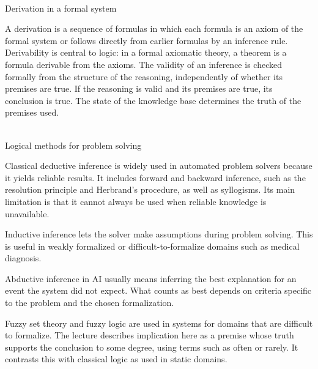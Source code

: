 \begin{frame}{\\Derivation in a formal system}
\topline
\justifying
\vspace{10mm}


        A derivation is a sequence of formulas in which each formula is an axiom of the formal system or follows directly from earlier formulas by an inference rule. Derivability is central to logic: in a formal axiomatic theory, a theorem is a formula derivable from the axioms. The validity of an inference is checked formally from the structure of the reasoning, independently of whether its premises are true. If the reasoning is valid and its premises are true, its conclusion is true. The state of the knowledge base determines the truth of the premises used.
\end{frame}

\begin{frame}{\\Logical methods for problem solving}
\topline
\justifying
\vspace{10mm}

    \begin{textitemize}
        \item Classical deductive inference is widely used in automated problem solvers because it yields reliable results. It includes forward and backward inference, such as the resolution principle and Herbrand's procedure, as well as syllogisms. Its main limitation is that it cannot always be used when reliable knowledge is unavailable.
        \item Inductive inference lets the solver make assumptions during problem solving. This is useful in weakly formalized or difficult-to-formalize domains such as medical diagnosis.
    \end{textitemize}
\end{frame}

\begin{frame}{}
\topline
\justifying
\vspace{10mm}

    \begin{textitemize}
        \item  Abductive inference in AI usually means inferring the best explanation for an event the system did not expect. What counts as best depends on criteria specific to the problem and the chosen formalization.
        \item Fuzzy set theory and fuzzy logic are used in systems for domains that are difficult to formalize. The lecture describes implication here as a premise whose truth supports the conclusion to some degree, using terms such as often or rarely. It contrasts this with classical logic as used in static domains.
    \end{textitemize}
\end{frame}

